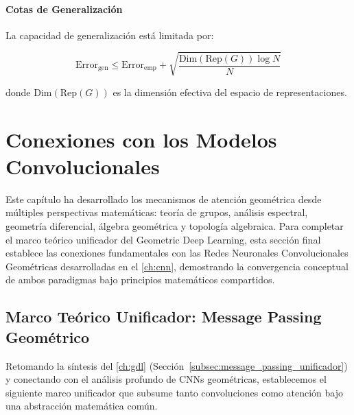 \paragraph{Cotas de Generalización}

La capacidad de generalización está limitada por:

\begin{equation}
\text{Error}_{\text{gen}} \leq \text{Error}_{\text{emp}} + \sqrt{\frac{\text{Dim}(\text{Rep}(G)) \log N}{N}}
\label{eq:geometric_generalization_bound}
\end{equation}

donde $\text{Dim}(\text{Rep}(G))$ es la dimensión efectiva del espacio de representaciones.

\section{Conexiones con los Modelos Convolucionales}\label{sec:cnn_attention_connections}

Este capítulo ha desarrollado los mecanismos de atención geométrica desde múltiples perspectivas matemáticas: teoría de grupos, análisis espectral, geometría diferencial, álgebra geométrica y topología algebraica. Para completar el marco teórico unificador del Geometric Deep Learning, esta sección final establece las conexiones fundamentales con las Redes Neuronales Convolucionales Geométricas desarrolladas en el \autoref{ch:cnn}, demostrando la convergencia conceptual de ambos paradigmas bajo principios matemáticos compartidos.

\subsection{Marco Teórico Unificador: Message Passing Geométrico}\label{subsec:marco_teorico_unificador}

Retomando la síntesis del \autoref{ch:gdl} (Sección~\ref{subsec:message_passing_unificador}) y conectando con el análisis profundo de CNNs geométricas, establecemos el siguiente marco unificador que subsume tanto convoluciones como atención bajo una abstracción matemática común.

